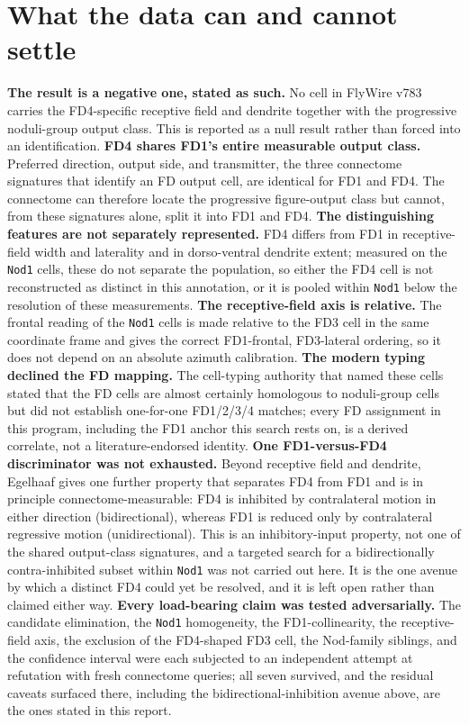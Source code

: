 \documentclass[11pt]{article}
\newcommand{\ttt}[1]{\texttt{#1}}
\begin{document}
\section{What the data can and cannot settle}

\textbf{The result is a negative one, stated as such.} No cell in FlyWire v783 carries the FD4-specific receptive field and dendrite together with the progressive noduli-group output class. This is reported as a null result rather than forced into an identification. \textbf{FD4 shares FD1's entire measurable output class.} Preferred direction, output side, and transmitter, the three connectome signatures that identify an FD output cell, are identical for FD1 and FD4. The connectome can therefore locate the progressive figure-output class but cannot, from these signatures alone, split it into FD1 and FD4. \textbf{The distinguishing features are not separately represented.} FD4 differs from FD1 in receptive-field width and laterality and in dorso-ventral dendrite extent; measured on the \ttt{Nod1} cells, these do not separate the population, so either the FD4 cell is not reconstructed as distinct in this annotation, or it is pooled within \ttt{Nod1} below the resolution of these measurements. \textbf{The receptive-field axis is relative.} The frontal reading of the \ttt{Nod1} cells is made relative to the FD3 cell in the same coordinate frame and gives the correct FD1-frontal, FD3-lateral ordering, so it does not depend on an absolute azimuth calibration. \textbf{The modern typing declined the FD mapping.} The cell-typing authority that named these cells stated that the FD cells are almost certainly homologous to noduli-group cells but did not establish one-for-one FD1/2/3/4 matches; every FD assignment in this program, including the FD1 anchor this search rests on, is a derived correlate, not a literature-endorsed identity. \textbf{One FD1-versus-FD4 discriminator was not exhausted.} Beyond receptive field and dendrite, Egelhaaf gives one further property that separates FD4 from FD1 and is in principle connectome-measurable: FD4 is inhibited by contralateral motion in either direction (bidirectional), whereas FD1 is reduced only by contralateral regressive motion (unidirectional). This is an inhibitory-input property, not one of the shared output-class signatures, and a targeted search for a bidirectionally contra-inhibited subset within \ttt{Nod1} was not carried out here. It is the one avenue by which a distinct FD4 could yet be resolved, and it is left open rather than claimed either way. \textbf{Every load-bearing claim was tested adversarially.} The candidate elimination, the \ttt{Nod1} homogeneity, the FD1-collinearity, the receptive-field axis, the exclusion of the FD4-shaped FD3 cell, the Nod-family siblings, and the confidence interval were each subjected to an independent attempt at refutation with fresh connectome queries; all seven survived, and the residual caveats surfaced there, including the bidirectional-inhibition avenue above, are the ones stated in this report.
\end{document}
